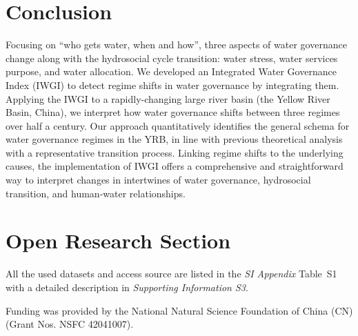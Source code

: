 \documentclass[draft]{agujournal2019}
\begin{document}
\section{Conclusion}\label{sec13}
Focusing on ``who gets water, when and how'', three aspects of water governance change along with the hydrosocial cycle transition: water stress, water services purpose, and water allocation. We developed an Integrated Water Governance Index (IWGI) to detect regime shifts in water governance by integrating them. Applying the IWGI to a rapidly-changing large river basin (the Yellow River Basin, China), we interpret how water governance shifts between three regimes over half a century. Our approach quantitatively identifies the general schema for water governance regimes in the YRB, in line with previous theoretical analysis with a representative transition process. Linking regime shifts to the underlying causes, the implementation of IWGI offers a comprehensive and straightforward way to interpret changes in intertwines of water governance, hydrosocial transition, and human-water relationships.
























\section*{Open Research Section}
All the used datasets and access source are listed in the \textit{SI Appendix} Table~S1 with a detailed description in \textit{Supporting Information S3}.



\acknowledgments
Funding was provided by the National Natural Science Foundation of China (CN) (Grant Nos. NSFC 42041007).


\end{document}
